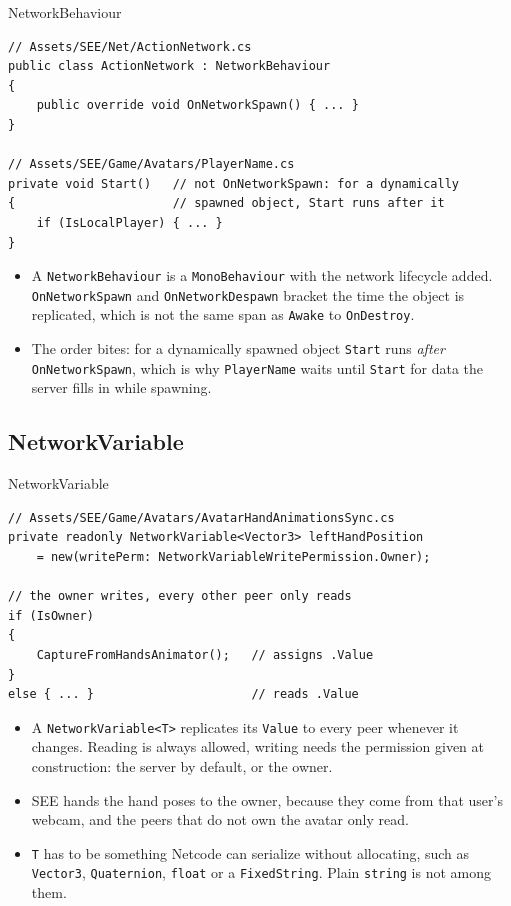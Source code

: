 \begin{frame}[fragile]{NetworkBehaviour}
  \begin{lstlisting}[basicstyle=\scriptsize\ttfamily]
// Assets/SEE/Net/ActionNetwork.cs
public class ActionNetwork : NetworkBehaviour
{
    public override void OnNetworkSpawn() { ... }
}

// Assets/SEE/Game/Avatars/PlayerName.cs
private void Start()   // not OnNetworkSpawn: for a dynamically
{                      // spawned object, Start runs after it
    if (IsLocalPlayer) { ... }
}
  \end{lstlisting}
  \vspace{0.5ex}

  \begin{itemize}
    \item A \texttt{NetworkBehaviour} is a \texttt{MonoBehaviour} with the
      network lifecycle added. \texttt{OnNetworkSpawn} and
      \texttt{OnNetworkDespawn} bracket the time the object is replicated, which
      is not the same span as \texttt{Awake} to \texttt{OnDestroy}.
    \item The order bites: for a dynamically spawned object \texttt{Start} runs
      \emph{after} \texttt{OnNetworkSpawn}, which is why \texttt{PlayerName}
      waits until \texttt{Start} for data the server fills in while spawning.
  \end{itemize}
\end{frame}

\subsection{NetworkVariable}

\begin{frame}[fragile]{NetworkVariable}
  \begin{lstlisting}[basicstyle=\scriptsize\ttfamily]
// Assets/SEE/Game/Avatars/AvatarHandAnimationsSync.cs
private readonly NetworkVariable<Vector3> leftHandPosition
    = new(writePerm: NetworkVariableWritePermission.Owner);

// the owner writes, every other peer only reads
if (IsOwner)
{
    CaptureFromHandsAnimator();   // assigns .Value
}
else { ... }                      // reads .Value
  \end{lstlisting}
  \vspace{0.5ex}

  \begin{itemize}
    \item A \texttt{NetworkVariable<T>} replicates its \texttt{Value} to every
      peer whenever it changes. Reading is always allowed, writing needs the
      permission given at construction: the server by default, or the owner.
    \item SEE hands the hand poses to the owner, because they come from that
      user's webcam, and the peers that do not own the avatar only read.
    \item \texttt{T} has to be something Netcode can serialize without
      allocating, such as \texttt{Vector3}, \texttt{Quaternion},
      \texttt{float} or a \texttt{FixedString}. Plain \texttt{string} is not
      among them.
  \end{itemize}
\end{frame}

